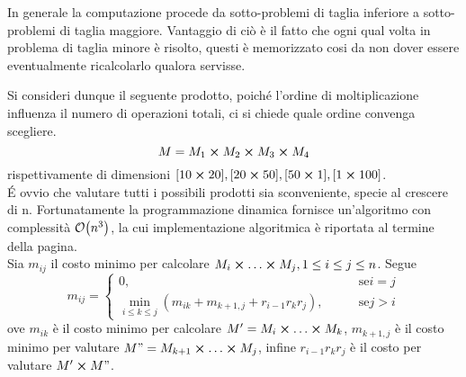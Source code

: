 \documentclass{subfiles}
\begin{document}
\noindent In generale la computazione procede da sotto-problemi di taglia inferiore a sotto-problemi di taglia maggiore.
Vantaggio di ciò è il fatto che ogni qual volta in problema di taglia minore è risolto, questi è memorizzato cosi da non dover essere eventualmente ricalcolarlo qualora servisse.

\begin{Example*}
    Si consideri dunque il seguente prodotto, poiché l'ordine di moltiplicazione influenza il numero di operazioni totali, ci si chiede quale ordine convenga scegliere.
    \[
        M = M_{1} \cp M_{2} \cp M_{3} \cp M_{4}
    \]
    \noindent rispettivamente di dimensioni \([10 \cp 20], [20 \cp 50], [50 \cp 1], [1 \cp 100]\).
    \\
    \'E ovvio che valutare tutti i possibili prodotti sia sconveniente, specie al crescere di n.
    Fortunatamente la programmazione dinamica fornisce un'algoritmo con complessità \(\order{n^{3}}\), la cui implementazione algoritmica è riportata al termine della pagina.
    \\
    Sia \(m_{ij}\) il costo minimo per calcolare \(M_{i} \cp \ldots \cp M_{j}, 1 \le i \le j \le n\). Segue
    \[
        m_{ij} = \begin{cases}
            0, \qquad                                                                        & \text{se} i = j \\
            \min\limits_{i \le k \le j}{(m_{ik} + m_{k+1, j} + r_{i - 1}r_{k}r_{j})}, \qquad & \text{se} j > i
        \end{cases}
    \]
    \noindent ove \(m_{ik}\) è il costo minimo per calcolare \(M' = M_{i} \cp \ldots \cp M_{k}\), \(m_{k + 1, j}\) è il costo minimo per valutare \(M" = M_{k + 1} \cp \ldots \cp M_{j}\),
    infine \(r_{i - 1}r_{k}r_{j}\) è il costo per valutare \(M' \cp M"\).
    

\end{Example*}
\end{document}
